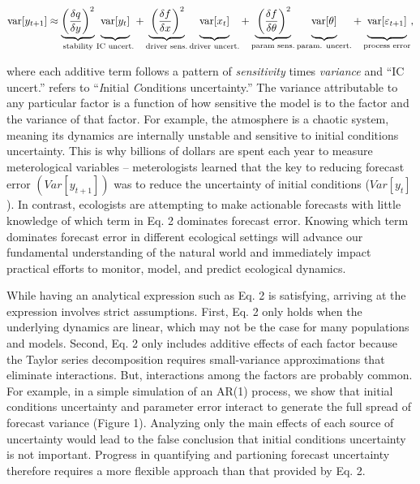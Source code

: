 \documentclass[12pt,]{article}
\begin{document}
\begin{align}
\text{var}[y_{t+1}] \approx \underbrace{\left(\frac{\delta q}{\delta y} \right)^2}_{\text{stability}} 
               \underbrace{\vphantom{ \left(\frac{\delta q}{\delta y} \right)^2 } \text{var}[y_t]}_{\text{IC uncert.}} +
               \underbrace{\vphantom{ \left(\frac{\delta q}{\delta y} \right)^2 }\left(\frac{\delta f}{\delta x} \right)^2}_{\text{driver sens.}} 
               \underbrace{\vphantom{ \left(\frac{\delta q}{\delta y} \right)^2 } \text{var}[x_t]}_{\text{driver uncert.}} +
               \underbrace{\vphantom{ \left(\frac{\delta q}{\delta y} \right)^2 }\left(\frac{\delta f}{\delta \theta} \right)^2}_{\text{param sens.}}
               \underbrace{\vphantom{ \left(\frac{\delta q}{\delta y} \right)^2 } \text{var}[\theta]}_{\text{param. uncert.}} +
\underbrace{\vphantom{ \left(\frac{\delta q}{\delta y} \right)^2 } \text{var}[\varepsilon_{t+1}]}_{\text{process error}},
\end{align}

\noindent{}where each additive term follows a pattern of
\emph{sensitivity} times \emph{variance} and ``IC uncert.'' refers to
``\emph{I}nitial \emph{C}onditions uncertainty.'' The variance
attributable to any particular factor is a function of how sensitive the
model is to the factor and the variance of that factor. For example, the
atmosphere is a chaotic system, meaning its dynamics are internally
unstable and sensitive to initial conditions uncertainty. This is why
billions of dollars are spent each year to measure meterological
variables -- meterologists learned that the key to reducing forecast
error \((Var[y_{t+1}])\) was to reduce the uncertainty of initial
conditions (\(Var[y_t]\)). In contrast, ecologists are attempting to
make actionable forecasts with little knowledge of which term in Eq. 2
dominates forecast error. Knowing which term dominates forecast error in
different ecological settings will advance our fundamental understanding
of the natural world and immediately impact practical efforts to
monitor, model, and predict ecological dynamics.

While having an analytical expression such as Eq. 2 is satisfying,
arriving at the expression involves strict assumptions. First, Eq. 2
only holds when the underlying dynamics are linear, which may not be the
case for many populations and models. Second, Eq. 2 only includes
additive effects of each factor because the Taylor series decomposition
requires small-variance approximations that eliminate interactions. But,
interactions among the factors are probably common. For example, in a
simple simulation of an AR(1) process, we show that initial conditions
uncertainty and parameter error interact to generate the full spread of
forecast variance (Figure 1). Analyzing only the main effects of each
source of uncertainty would lead to the false conclusion that initial
conditions uncertainty is not important. Progress in quantifying and
partioning forecast uncertainty therefore requires a more flexible
approach than that provided by Eq. 2.
\end{document}
